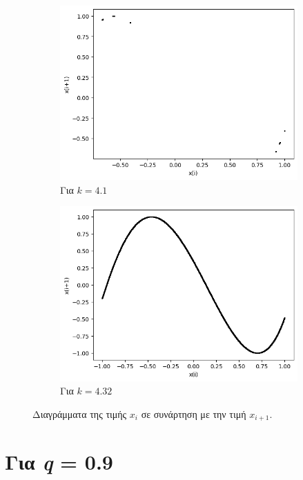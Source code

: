 \begin{figure}[ht]
\begin{subfigure}[b]{0.4\textwidth}
		\includegraphics[width=\textwidth]{LateX images/cheb q=0.8/g13}
		\caption{Για $k=4.1$}
		\label{f:k140}
	\end{subfigure}
	\hfill
	\begin{subfigure}[b]{0.4\textwidth}
		\centering
		\includegraphics[width=\textwidth]{LateX images/cheb q=0.8/g9}
		\caption{Για $k=4.32$}
		\label{f:k136}
	\end{subfigure}
	\hfill	
	\caption{Διαγράμματα της τιμής \(x_i\) σε συνάρτηση με την τιμή \(x_{i+1}\).}
	\label{f:k249}
\end{figure}

\clearpage

\section{Για \emph{q} = 0.9}

